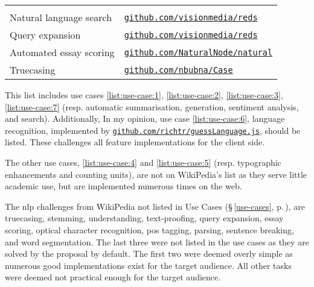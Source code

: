 {\begin{tabular}{ l p{5.25cm} }
{  }\\
  Natural language search &{\raggedright
  \href{https://github.com/visionmedia/reds}{\nolinkurl{github.com/visionmedia/reds}}
  }\\
  Query expansion &{\raggedright
  \href{https://github.com/visionmedia/reds}{\nolinkurl{github.com/visionmedia/reds}}
  }\\
  Automated essay scoring &{\raggedright
  \href{https://github.com/NaturalNode/natural}{\nolinkurl{github.com/NaturalNode/natural}}
  }\\
  Truecasing &{\raggedright
  \href{https://github.com/nbubna/Case}{\nolinkurl{github.com/nbubna/Case}}
  }\\
\end{tabular}
}

\medskip\noindent This list includes use cases \ref{list:use-case:1},
  \ref{list:use-case:2}, \ref{list:use-case:3}, \ref{list:use-case:7}
  (resp. automatic summarisation, generation, sentiment analysis, and
  search).
Additionally, In my opinion, use case \ref{list:use-case:6}, language
  recognition, implemented by
  \href{https://github.com/richtr/guessLanguage.js}{\nolinkurl{github.com/richtr/guessLanguage.js}},
  should be listed.
These challenges all feature implementations for the client side.

The other use cases, \ref{list:use-case:4} and \ref{list:use-case:5} (resp.
  typographic enhancements and counting units), are not on WikiPedia's list as
  they serve little academic use, but are implemented numerous times on the
  web.

The \gls{nlp} challenges from WikiPedia not listed in Use Cases
  (§\,\ref{use-cases}, p.\,\pageref{use-cases}), are truecasing,
  stemming, understanding, text-proofing, query expansion, essay scoring,
  optical character recognition, \gls{pos} tagging, parsing,
  sentence breaking, and word segmentation.
The last three were not listed in the use cases as they are solved by the
  proposal by default.
The first two were deemed overly simple as numerous good implementations exist
  for the target audience.
All other tasks were deemed not practical enough for the target audience.

\endgroup
